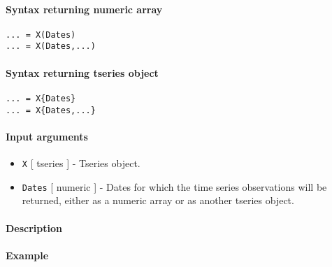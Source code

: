 


	\paragraph{Syntax returning numeric
array}\label{syntax-returning-numeric-array}

\begin{verbatim}
... = X(Dates)
... = X(Dates,...)
\end{verbatim}

\paragraph{Syntax returning tseries
object}\label{syntax-returning-tseries-object}

\begin{verbatim}
... = X{Dates}
... = X{Dates,...}
\end{verbatim}

\paragraph{Input arguments}\label{input-arguments}

\begin{itemize}
\item
  \texttt{X} {[} tseries {]} - Tseries object.
\item
  \texttt{Dates} {[} numeric {]} - Dates for which the time series
  observations will be returned, either as a numeric array or as another
  tseries object.
\end{itemize}

\paragraph{Description}\label{description}

\paragraph{Example}\label{example}



